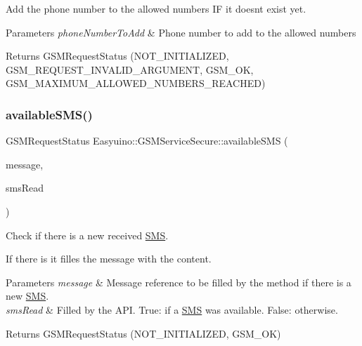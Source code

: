 Add the phone number to the allowed numbers IF it doesn\textquotesingle{}t exist yet. 


\begin{DoxyParams}{Parameters}
{\em phone\+Number\+To\+Add} & Phone number to add to the allowed numbers \\
\hline
\end{DoxyParams}
\begin{DoxyReturn}{Returns}
G\+S\+M\+Request\+Status (N\+O\+T\+\_\+\+I\+N\+I\+T\+I\+A\+L\+I\+Z\+ED, G\+S\+M\+\_\+\+R\+E\+Q\+U\+E\+S\+T\+\_\+\+I\+N\+V\+A\+L\+I\+D\+\_\+\+A\+R\+G\+U\+M\+E\+NT, G\+S\+M\+\_\+\+OK, G\+S\+M\+\_\+\+M\+A\+X\+I\+M\+U\+M\+\_\+\+A\+L\+L\+O\+W\+E\+D\+\_\+\+N\+U\+M\+B\+E\+R\+S\+\_\+\+R\+E\+A\+C\+H\+ED) 
\end{DoxyReturn}
\mbox{\label{class_easyuino_1_1_g_s_m_service_secure_a42177d8a9943f30a2b63f9bc51a5370d}} 
\subsubsection{\texorpdfstring{available\+S\+M\+S()}{availableSMS()}}
{\footnotesize\ttfamily G\+S\+M\+Request\+Status Easyuino\+::\+G\+S\+M\+Service\+Secure\+::available\+S\+MS (\begin{DoxyParamCaption}\item[{O\+UT \hyperlink{class_easyuino_1_1_s_m_s}{S\+MS} \&}]{message,  }\item[{O\+UT bool \&}]{sms\+Read }\end{DoxyParamCaption})\hspace{0.3cm}{\ttfamily [virtual]}}



Check if there is a new received \hyperlink{class_easyuino_1_1_s_m_s}{S\+MS}. 

If there is it filles the message with the content. 
\begin{DoxyParams}{Parameters}
{\em message} & Message reference to be filled by the method if there is a new \hyperlink{class_easyuino_1_1_s_m_s}{S\+MS}. \\
\hline
{\em sms\+Read} & Filled by the A\+PI. True\+: if a \hyperlink{class_easyuino_1_1_s_m_s}{S\+MS} was available. False\+: otherwise. \\
\hline
\end{DoxyParams}
\begin{DoxyReturn}{Returns}
G\+S\+M\+Request\+Status (N\+O\+T\+\_\+\+I\+N\+I\+T\+I\+A\+L\+I\+Z\+ED, G\+S\+M\+\_\+\+OK) 
\end{DoxyReturn}


